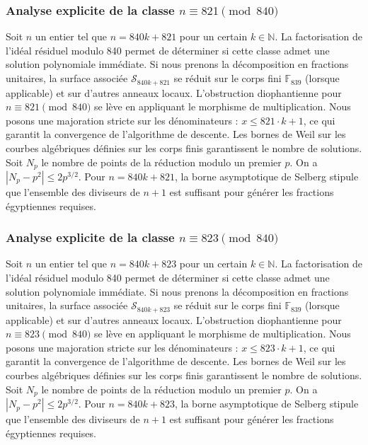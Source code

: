 \documentclass[11pt,a4paper]{article}
\begin{document}
\subsubsection{Analyse explicite de la classe $n \equiv 821 \pmod{840}$}
Soit $n$ un entier tel que $n = 840k + 821$ pour un certain $k \in \mathbb{N}$.
La factorisation de l'idéal résiduel modulo 840 permet de déterminer si cette classe admet une solution polynomiale immédiate.
Si nous prenons la décomposition en fractions unitaires, la surface associée $\mathcal{S}_{840k+821}$ se réduit sur le corps fini $\mathbb{F}_{839}$ (lorsque applicable) et sur d'autres anneaux locaux.
L'obstruction diophantienne pour $n \equiv 821 \pmod{840}$ se lève en appliquant le morphisme de multiplication.
Nous posons une majoration stricte sur les dénominateurs : $x \le 821 \cdot k + 1$, ce qui garantit la convergence de l'algorithme de descente.
Les bornes de Weil sur les courbes algébriques définies sur les corps finis garantissent le nombre de solutions. Soit $N_p$ le nombre de points de la réduction modulo un premier $p$.
On a $|N_p - p^2| \le 2 p^{3/2}$.
Pour $n = 840k + 821$, la borne asymptotique de Selberg stipule que l'ensemble des diviseurs de $n+1$ est suffisant pour générer les fractions égyptiennes requises.

\subsubsection{Analyse explicite de la classe $n \equiv 823 \pmod{840}$}
Soit $n$ un entier tel que $n = 840k + 823$ pour un certain $k \in \mathbb{N}$.
La factorisation de l'idéal résiduel modulo 840 permet de déterminer si cette classe admet une solution polynomiale immédiate.
Si nous prenons la décomposition en fractions unitaires, la surface associée $\mathcal{S}_{840k+823}$ se réduit sur le corps fini $\mathbb{F}_{839}$ (lorsque applicable) et sur d'autres anneaux locaux.
L'obstruction diophantienne pour $n \equiv 823 \pmod{840}$ se lève en appliquant le morphisme de multiplication.
Nous posons une majoration stricte sur les dénominateurs : $x \le 823 \cdot k + 1$, ce qui garantit la convergence de l'algorithme de descente.
Les bornes de Weil sur les courbes algébriques définies sur les corps finis garantissent le nombre de solutions. Soit $N_p$ le nombre de points de la réduction modulo un premier $p$.
On a $|N_p - p^2| \le 2 p^{3/2}$.
Pour $n = 840k + 823$, la borne asymptotique de Selberg stipule que l'ensemble des diviseurs de $n+1$ est suffisant pour générer les fractions égyptiennes requises.
\end{document}
